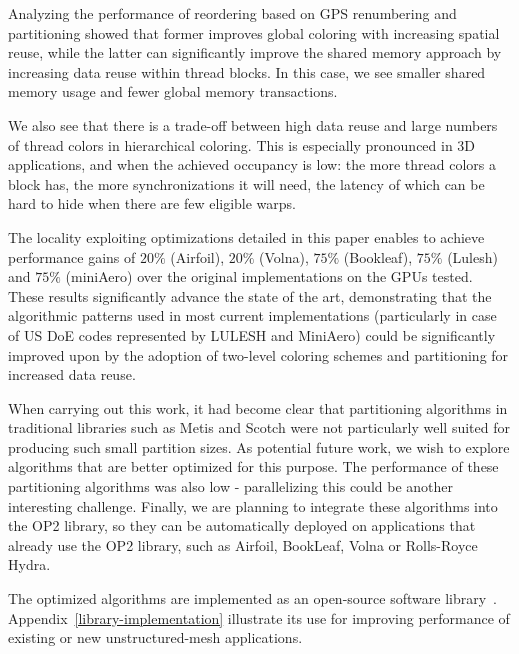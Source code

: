 \documentclass[number]{elsarticle}
\begin{document}
Analyzing the performance of reordering based on GPS renumbering and 
partitioning showed that former improves global coloring with increasing 
spatial reuse, while the latter can significantly improve the shared memory 
approach by increasing data reuse within thread blocks. In this case, we 
see smaller shared memory usage and fewer global memory transactions.

We also see that there is a trade-off between high data reuse and large numbers 
of thread colors in hierarchical coloring. This is especially pronounced in 3D 
applications, and when the achieved occupancy is low: the more thread colors a 
block has, the more synchronizations it will need, the latency of which can be 
hard to hide when there are few eligible warps.

The locality exploiting optimizations detailed in this paper enables to 
achieve performance gains of $20\%$ (Airfoil), $20\%$ (Volna), $75\%$ 
(Bookleaf), $75\%$ (Lulesh) and $75\%$ (miniAero) over the original 
implementations on the GPUs tested. These results significantly advance the 
state of the art, demonstrating that the algorithmic patterns used in most 
current implementations (particularly in case of US DoE codes represented by 
LULESH and MiniAero) could be significantly improved upon by the adoption of 
two-level coloring schemes and partitioning for increased data reuse.

When carrying out this work, it had become clear that partitioning algorithms in
traditional libraries such as Metis and Scotch were not particularly well suited
for producing such small partition sizes. As potential future work, we wish to
explore algorithms that are better optimized for this purpose. The performance
of these partitioning algorithms was also low - parallelizing this could be
another interesting challenge. Finally, we are planning to integrate these
algorithms into the OP2 library, so they can be automatically deployed on
applications that already use the OP2 library, such as Airfoil, BookLeaf, Volna
or Rolls-Royce Hydra.

The optimized algorithms are implemented as an open-source software 
library~\cite{library}. Appendix~\ref{library-implementation} illustrate its 
use for improving performance of existing or new unstructured-mesh applications.


\end{document}
